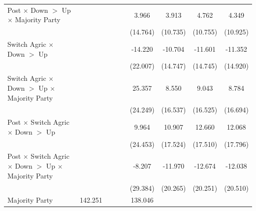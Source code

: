 {\begin{tabular}{l*{8}{c}}
Post $\times$ Down $>$ Up $\times$ Majority Party&                     &                     &                     &                     &       3.966         &       3.913         &       4.762         &       4.349         \\
            &                     &                     &                     &                     &    (14.764)         &    (10.735)         &    (10.755)         &    (10.925)         \\
Switch Agric $\times$ Down $>$ Up&                     &                     &                     &                     &     -14.220         &     -10.704         &     -11.601         &     -11.352         \\
            &                     &                     &                     &                     &    (22.007)         &    (14.747)         &    (14.745)         &    (14.920)         \\
Switch Agric $\times$ Down $>$ Up $\times$ Majority Party&                     &                     &                     &                     &      25.357         &       8.550         &       9.043         &       8.784         \\
            &                     &                     &                     &                     &    (24.249)         &    (16.537)         &    (16.525)         &    (16.694)         \\
Post $\times$ Switch Agric $\times$ Down $>$ Up&                     &                     &                     &                     &       9.964         &      10.907         &      12.660         &      12.068         \\
            &                     &                     &                     &                     &    (24.453)         &    (17.524)         &    (17.510)         &    (17.796)         \\
Post $\times$ Switch Agric $\times$ Down $>$ Up $\times$ Majority Party&                     &                     &                     &                     &      -8.207         &     -11.970         &     -12.674         &     -12.038         \\
            &                     &                     &                     &                     &    (29.384)         &    (20.265)         &    (20.251)         &    (20.510)         \\
Majority Party&     142.251\sym{***}&                     &                     &                     &     138.046\sym{***}&                     &                     &                     \\

\end{tabular}}
